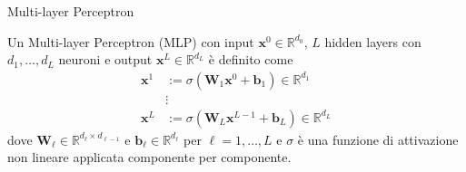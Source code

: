\documentclass[aspectratio=169]{beamer}
\newcommand{\numberset}{\mathbb}
\newcommand{\R}{\numberset{R}}
\begin{document}
\begin{frame}{Multi-layer Perceptron}
 \begin{definition}
  Un Multi-layer Perceptron (MLP) con input $\mathbf{x}^{0}\in \R^{d_{0}}$, $L$ hidden layers con $d_{1}, \ldots, d_{L}$ neuroni e output $\mathbf{x}^{L}\in \R^{d_{L}}$ è definito come
    \begin{align*}
     \mathbf{x}^{1} &:= \sigma\left( \mathbf{W}_{1} \mathbf{x}^{0} + \mathbf{b}_{1} \right) \in \R^{d_{1}} \\
     &\vdots \\
     \mathbf{x}^{L} &:= \sigma\left( \mathbf{W}_{L} \mathbf{x}^{L-1} + \mathbf{b}_{L} \right) \in \R^{d_{L}}
    \end{align*}
    dove $\mathbf{W}_{\ell}\in \R^{d_{\ell}\times d_{\ell-1}}$ e $\mathbf{b}_{\ell}\in \R^{d_{\ell}}$ per $\ell=1,\ldots, L$ e $\sigma$ è una funzione di attivazione non lineare applicata componente per componente.
 \end{definition}
\end{frame}
\end{document}
